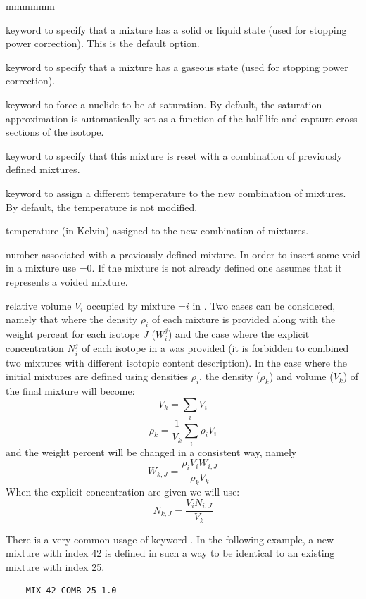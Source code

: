 \begin{ListeDeDescription}{mmmmmm}
\item[\moc{NOGAS}] keyword to specify that a mixture has a solid or liquid state (used for stopping power correction).
This is the default option.

\item[\moc{GAS}] keyword to specify that a mixture has a gaseous state (used for stopping power correction).

\item[\moc{SAT}] keyword to force a nuclide to be at saturation. By default, the saturation approximation is
automatically set as a function of the half life and capture cross sections of the isotope.

\item[\moc{COMB}]  keyword to specify that this mixture is reset with a combination of previously defined mixtures.

\item[\moc{TEMP}]  keyword to assign a different temperature to the new combination of mixtures.
By default, the temperature is not modified.

\item[\dusa{tempi}]  temperature (in Kelvin) assigned to the new combination of mixtures.

\item[\dusa{mati}]  number associated with a previously defined mixture. In
order to insert some void in a mixture use =0. If the mixture is not
already defined one assumes that it represents a voided mixture.

\item[\dusa{relvol}] relative volume $V_{i}$ occupied by mixture
=$i$ in .  Two cases can be considered, namely that
where the density $\rho_{i}$ of each mixture  is provided along with
the weight percent for each isotope $J$ ($W_{i}^{j}$) and the case where the
explicit concentration $N_{i}^{j}$ of each isotope in a  was provided
(it is forbidden to combined two mixtures with different isotopic content
description). In the case where the initial mixtures are defined using densities
$\rho_{i}$, the density ($\rho_k$) and volume ($V_{k}$) of the final mixture
will become:
  $$V_{k}=\sum_{i} V_{i} $$
  $$\rho_{k}=\frac{1}{V_{k}} \sum_{i}\rho_{i}V_{i}$$
and the weight percent will be changed in a consistent way, namely
  $$W_{k,J}=\frac{\rho_{i}V_{i}W_{i,J}}{\rho_{k} V_{k} } $$
When the explicit concentration are given we will use:
  $$N_{k,J}=\frac{V_{i}N_{i,J}}{V_{k} } $$

\vskip 0.08cm

There is a very common usage of keyword . In the following example, a new mixture with index 42
is defined in such a way to be identical to an existing mixture with index 25. 
\begin{verbatim}
    MIX 42 COMB 25 1.0
\end{verbatim}

\end{ListeDeDescription}

